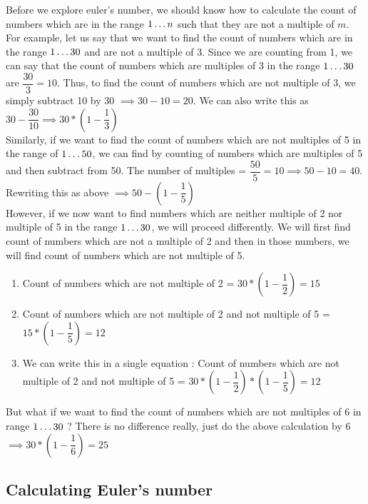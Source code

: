 Before we explore euler's number, we should know how to calculate the count of numbers which are in the range ${1} \ldots {n}$ such that they are not a multiple of $m$. \\

For example, let us say that we want to find the count of numbers which are in the range ${1} \ldots {30}$ and are not a multiple of 3. Since we are counting from 1, we can say that the count of numbers which are multiples of 3 in the range ${1} \ldots {30}$ are $\dfrac{30}{3} = 10$. Thus, to find the count of numbers which are not multiple of 3, we simply subtract 10 by 30 $\implies 30 - 10 = 20$. We can also write this as $30 - \dfrac{30}{10} \implies 30 * \left ( 1 - \dfrac{1}{3} \right )$ \\

Similarly, if we want to find the count of numbers which are not multiples of 5 in the range of ${1} \ldots {50}$, we can find by counting of numbers which are multiples of 5 and then subtract from 50. The number of multiples = $\dfrac{50}{5} = 10 \implies 50 - 10 = 40$. Rewriting this as above $\implies 50 - \left ( 1 - \dfrac{1}{5} \right )$ \\

However, if we now want to find numbers which are neither multiple of 2 nor multiple of 5 in the range ${1} \ldots {30}$, we will proceed differently. We will first find count of numbers which are not a multiple of 2 and then in those numbers, we will find count of numbers which are not multiple of 5.

\begin{enumerate}
    \item Count of numbers which are not multiple of 2 = $30 * \left ( 1 - \dfrac{1}{2} \right ) = 15$
    \item Count of numbers which are not multiple of 2 and not multiple of 5 = $15 * \left ( 1 - \dfrac{1}{5} \right ) = 12$
    \item We can write this in a single equation : Count of numbers which are not multiple of 2 and not multiple of 5 = $30 * \left ( 1 - \dfrac{1}{2} \right ) * \left ( 1 - \dfrac{1}{5} \right ) = 12$
\end{enumerate}

But what if we want to find the count of numbers which are not multiples of 6 in range ${1} \ldots {30}$ ? There is no difference really, just do the above calculation by 6 $\implies 30 * \left ( 1 - \dfrac{1}{6} \right ) = 25$

\subsection{Calculating Euler's number}

